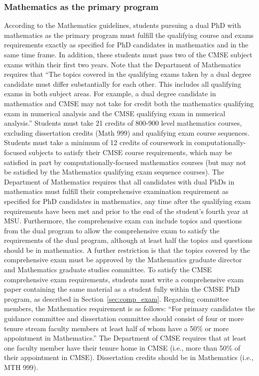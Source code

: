 \subsubsection{Mathematics as the primary program}

According to the Mathematics guidelines, students pursuing a dual PhD
with mathematics as the primary program must fulfill the qualifying
course and exams requirements exactly as specified for PhD candidates
in mathematics and in the same time frame.  In addition, these
students must pass two of the CMSE subject exams within their first
two years.  Note that the Department of Mathematics requires that
``The topics covered in the qualifying exams taken by a dual degree
candidate must differ substantially for each other. This includes all
qualifying exams in both subject areas. For example, a dual degree
candidate in mathematics and CMSE may not take for credit both the
mathematics qualifying exam in numerical analysis and the CMSE
qualifying exam in numerical analysis.''  Students must take 21
credits of 800-900 level mathematics courses, excluding dissertation
credits (Math 999) and qualifying exam course sequences.  Students
must take a minimum of 12 credits of coursework in
computationally-focused subjects to satisfy their CMSE course
requirements, which may be satisfied in part by computationally-focused
mathematics courses (but may not be satisfied by the Mathematics
qualifying exam sequence courses).  The Department of Mathematics requires that all
candidates with dual PhDs in mathematics must fulfill their
comprehensive examination requirement as specified for PhD candidates
in mathematics, any time after the qualifying exam requirements have
been met and prior to the end of the student's fourth year at MSU.
Furthermore, the comprehensive exam can include topics and questions
from the dual program to allow the comprehensive exam to satisfy the
requirements of the dual program, although at least half the topics
and questions should be in mathematics.  A further restriction is that
the topics covered by the comprehensive exam must be approved by the
Mathematics graduate director and Mathematics graduate studies
committee.  To satisfy the CMSE comprehensive exam requirements,
students must write a comprehensive exam paper containing the same
material as a student fully within the CMSE PhD program, as described
in Section~\ref{sec:comp_exam}.  Regarding committee members, the
Mathematics requirement is as follows: ``For primary candidates the
guidance committee and dissertation committee should consist of four
or more tenure stream faculty members at least half of whom have a
50\% or more appointment in Mathematics.''  The Department of CMSE
requires that at least one faculty member have their tenure home in
CMSE (i.e., more than 50\% of their appointment in CMSE).
Dissertation credits should be in Mathematics (i.e., MTH 999).


